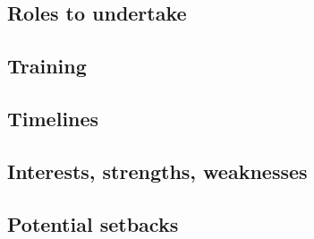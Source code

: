 \subsection{Roles to undertake}

\subsection{Training}

\subsection{Timelines}

\subsection{Interests, strengths, weaknesses}

\subsection{Potential setbacks}
